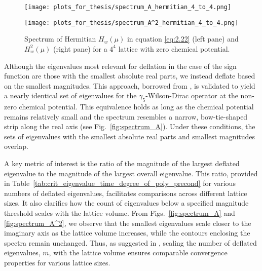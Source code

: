 \begin{figure}[H]
    \centering
    \begin{minipage}{0.45\textwidth}
        \centering
        \texttt{[image: plots\_for\_thesis/spectrum\_A\_hermitian\_4\_to\_4.png]} %
    \end{minipage}%
    \hspace{0.02\textwidth} %
    \begin{minipage}{0.45\textwidth}
        \centering
        \texttt{[image: plots\_for\_thesis/spectrum\_A^2\_hermitian\_4\_to\_4.png]} %
    \end{minipage}
    \caption{\small Spectrum of Hermitian $ H_w(\mu)$ in equation \eqref{eq:2.22} (left pane) and $H_w^2(\mu)$ (right pane) for a $4^4$ lattice with zero chemical potential.}
    \label{fig:spectrum_A_herm}
\end{figure}

Although the eigenvalues most relevant for deflation in the case of the sign function are those with the smallest absolute real parts, we instead deflate based on the smallest magnitudes. This approach, borrowed from \cite{11}, is validated to yield a nearly identical set of eigenvalues for the $\gamma_5$-Wilson-Dirac operator at the non-zero chemical potential. This equivalence holds as long as the chemical potential remains relatively small and the spectrum resembles a narrow, bow-tie-shaped strip along the real axis (see Fig.~\ref{fig:spectrum_A}). Under these conditions, the sets of eigenvalues with the smallest absolute real parts and smallest magnitudes overlap.

A key metric of interest is the ratio of the magnitude of the largest deflated eigenvalue to the magnitude of the largest overall eigenvalue. This ratio, provided in Table~\ref{tab:crit_eigenvalue_time_degree_of_poly_precond} for various numbers of deflated eigenvalues, facilitates comparisons across different lattice sizes. It also clarifies how the count of eigenvalues below a specified magnitude threshold scales with the lattice volume. From Figs.~\ref{fig:spectrum_A} and \ref{fig:spectrum_A^2}, we observe that the smallest eigenvalues scale closer to the imaginary axis as the lattice volume increases, while the contours enclosing the spectra remain unchanged. Thus, as suggested in \cite{11}, scaling the number of deflated eigenvalues, $m$, with the lattice volume ensures comparable convergence properties for various lattice sizes.

